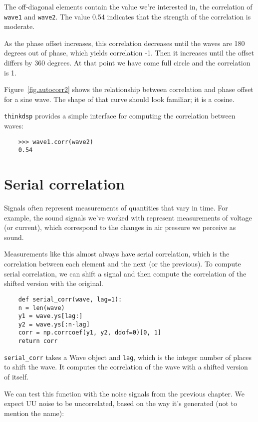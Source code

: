 The off-diagonal elements contain the value we're interested in,
the correlation of {\tt wave1} and {\tt wave2}.  The value 0.54
indicates that the strength of the correlation is moderate.

As the phase offset increases, this correlation decreases until
the waves are 180 degrees out of phase, which yields correlation
-1.  Then it increases until the offset differs by 360 degrees.
At that point we have come full circle and the correlation is 1.

Figure~\ref{fig.autocorr2} shows the relationship between correlation and
phase offset for a sine wave.  The shape of that curve should look
familiar; it is a cosine.

{\tt thinkdsp} provides a simple interface for computing the
correlation between waves:

\begin{verbatim}
	>>> wave1.corr(wave2)
	0.54
\end{verbatim}


\section{Serial correlation}

Signals often represent measurements of quantities that vary in
time.  For example, the sound signals we've worked with represent
measurements of voltage (or current), which correspond to the changes
in air pressure we perceive as sound.

Measurements like this almost always have serial correlation, which
is the correlation between each element and the next (or the previous).
To compute serial correlation, we can shift a signal and then compute
the correlation of the shifted version with the original.

\begin{verbatim}
	def serial_corr(wave, lag=1):
	n = len(wave)
	y1 = wave.ys[lag:]
	y2 = wave.ys[:n-lag]
	corr = np.corrcoef(y1, y2, ddof=0)[0, 1]
	return corr
\end{verbatim}

\verb"serial_corr" takes a Wave object and
{\tt lag}, which is the integer number of places to shift the wave.
It computes the correlation of the wave with a shifted version
of itself.

We can test this function with the noise signals from the previous
chapter.  We expect UU noise to be uncorrelated, based on the
way it's generated (not to mention the name):

